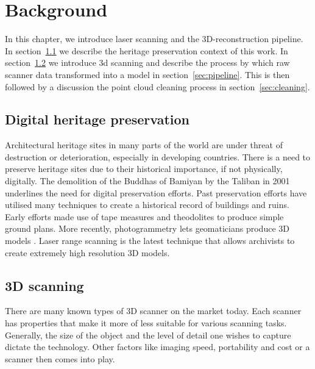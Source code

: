 \chapter{Background} \label{ch:background}


In this chapter, we introduce laser scanning and the 3D-reconstruction pipeline. In section~\ref{sec:heritage} we describe the heritage preservation context of this work. In section~\ref{sec:scanners} we introduce 3d scanning and describe the process by which raw scanner data transformed into a model in section~\ref{sec:pipeline}. This is then followed by a discussion the point cloud cleaning process in section~\ref{sec:cleaning}.


\section{Digital heritage preservation} \label{sec:heritage}

Architectural heritage sites in many parts of the world are under threat of destruction or deterioration, especially in developing countries. There is a need to preserve heritage sites due to their historical importance, if not physically, digitally. The demolition of  the Buddhas of Bamiyan by the Taliban in 2001 \cite{Toubekis2009} underlines the need for digital preservation efforts. Past preservation efforts have utilised many techniques to create a historical record of buildings and ruins. Early efforts made use of tape measures and theodolites to produce simple ground plans.  More recently, photogrammetry lets geomaticians produce 3D models \cite{Heritage}. Laser range scanning is the latest technique that allows archivists to create extremely high resolution 3D models.


\section{3D scanning} \label{sec:scanners}


There are many known types of 3D scanner on the market today. Each scanner has properties that make it more of less suitable for various scanning tasks. Generally, the size of the object and the level of detail one wishes to capture dictate the technology. Other factors like imaging speed, portability and cost or a scanner then comes into play.

